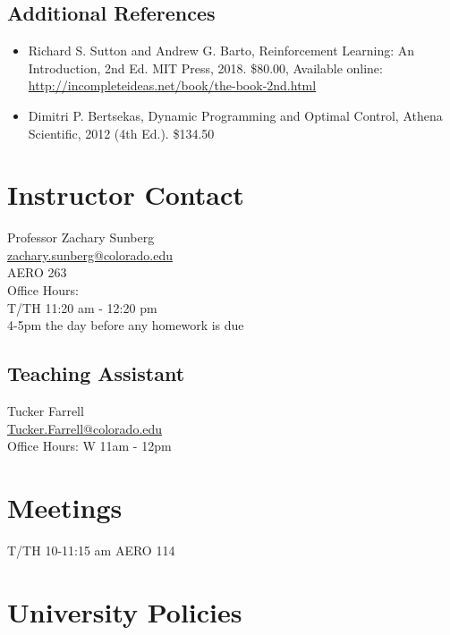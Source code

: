 \documentclass[9pt]{article}
\begin{document}
\subsection*{Additional References}

\begin{itemize}[noitemsep]
    \item Richard S. Sutton and Andrew G. Barto, Reinforcement Learning: An Introduction, 2nd Ed. MIT Press, 2018. \$80.00, Available online: \url{http://incompleteideas.net/book/the-book-2nd.html}
    \item Dimitri P. Bertsekas, Dynamic Programming and Optimal Control, Athena Scientific, 2012 (4th Ed.). \$134.50
\end{itemize}

\vspace{12pt}
\begin{multicols}{2}
    \begin{minipage}{\columnwidth}
\section*{Instructor Contact}

Professor Zachary Sunberg\\
\href{mailto://zachary.sunberg@colorado.edu}{zachary.sunberg@colorado.edu}\\
AERO 263\\
Office Hours:\\
T/TH 11:20 am - 12:20 pm\\
4-5pm the day before any homework is due


\subsection*{Teaching Assistant}

Tucker Farrell\\
\href{mailto://Tucker.Farrell@colorado.edu}{Tucker.Farrell@colorado.edu}\\
Office Hours: W 11am - 12pm
    \end{minipage}

\section*{Meetings}

T/TH 10-11:15 am AERO 114
\end{multicols}

\section*{University Policies}
\end{document}
